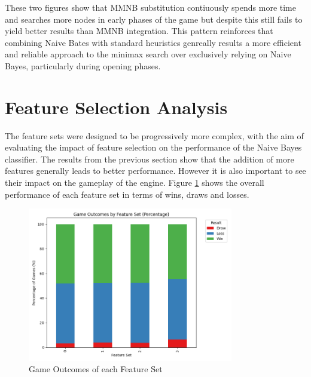 These two figures show that MMNB substitution contiuously spends more time and searches more nodes in early phases of the game but despite this still fails to yield better results than MMNB integration. This pattern reinforces that combining Naive Bates with standard heuristics genreally results a more efficient and reliable approach to the minimax search over exclusively relying on Naive Bayes, particularly during opening phases.


\section{Feature Selection Analysis}

The feature sets were designed to be progressively more complex, with the aim of evaluating the impact of feature selection on the performance of the Naive Bayes classifier. The results from the previous section show that the addition of more features generally leads to better performance. However it is also important to see their impact on the gameplay of the engine. Figure \ref{fig: feature_set_vs_win_rate} shows the overall performance of each feature set in terms of wins, draws and losses.
\begin{figure}[H]
    \centering
    \includegraphics[width=0.8\textwidth]{images/plots/featureSet/Feature_set_vs_win_rate.png}
    \caption{Game Outcomes of each Feature Set}
    \label{fig: feature_set_vs_win_rate}
\end{figure}





